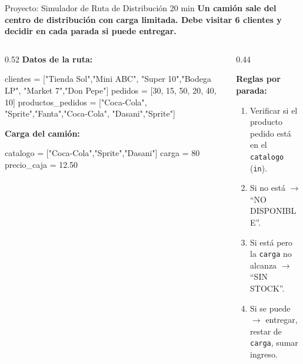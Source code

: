\documentclass[aspectratio=169, 11pt]{beamer}
\begin{document}
\begin{frame}[fragile,shrink=30]{Proyecto: Simulador de Ruta de Distribución \hfill {\normalsize\color{arcaRed}\faClock\hspace{4pt}20 min}}
  \vspace{-6pt}
  {\small\color{arcaDark}\bfseries
    Un camión sale del centro de distribución con carga limitada.
    Debe visitar 6 clientes y decidir en cada parada si puede entregar.}

  \vspace{4pt}
  \begin{columns}[T]
    \begin{column}{0.52\textwidth}
      {\footnotesize\color{arcaDark}\bfseries Datos de la ruta:}
      \vspace{2pt}
      \begin{pyblock}
clientes  = ["Tienda Sol","Mini ABC",
  "Super 10","Bodega LP",
  "Market 7","Don Pepe"]
pedidos   = [30, 15, 50, 20, 40, 10]
productos_pedidos = ["Coca-Cola",
  "Sprite","Fanta","Coca-Cola",
  "Dasani","Sprite"]
      \end{pyblock}

      \vspace{2pt}
      {\footnotesize\color{arcaDark}\bfseries Carga del camión:}
      \vspace{2pt}
      \begin{pyblock}
catalogo = ["Coca-Cola","Sprite","Dasani"]
carga = 80
precio_caja = 12.50
      \end{pyblock}
    \end{column}

    \begin{column}{0.44\textwidth}
      {\footnotesize\color{textMuted}
        \textbf{Reglas por parada:}
        \begin{enumerate}\setlength{\itemsep}{2pt}
          \item Verificar si el producto pedido
            está en el \texttt{catalogo} (\texttt{in}).
          \item Si no está $\rightarrow$ ``NO DISPONIBLE''.
          \item Si está pero la \texttt{carga} no
            alcanza $\rightarrow$ ``SIN STOCK''.
          \item Si se puede $\rightarrow$ entregar,
            restar de \texttt{carga}, sumar ingreso.
        \end{enumerate}

}
\end{column}
\end{columns}
\end{frame}
\end{document}
